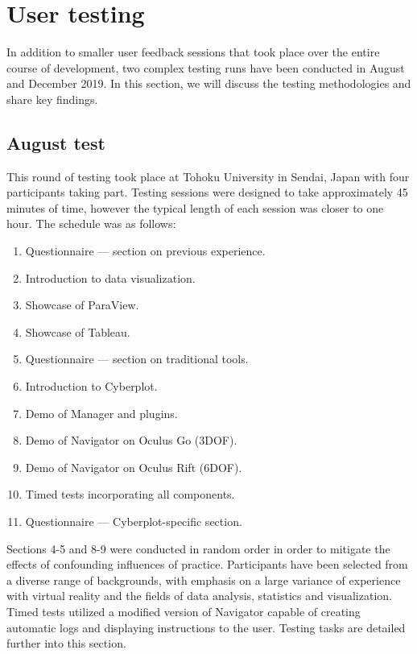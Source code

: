 \documentclass[thesis=M,english,hidelinks]{FITthesisXE}[2012/06/26]
\begin{document}
\section{User testing}

In addition to smaller user feedback sessions that took place over the entire course of development, two complex testing runs have been conducted in August and December 2019. In this section, we will discuss the testing methodologies and share key findings.

\subsection{August test}

This round of testing took place at Tohoku University in Sendai, Japan with four participants taking part. Testing sessions were designed to take approximately 45 minutes of time, however the typical length of each session was closer to one hour. The schedule was as follows:

\begin{enumerate}
\item Questionnaire --- section on previous experience.
\item Introduction to data visualization.
\item Showcase of ParaView.
\item Showcase of Tableau.
\item Questionnaire --- section on traditional tools.
\item Introduction to Cyberplot.
\item Demo of Manager and plugins.
\item Demo of Navigator on Oculus Go (3DOF).
\item Demo of Navigator on Oculus Rift (6DOF).
\item Timed tests incorporating all components.
\item Questionnaire --- Cyberplot-specific section.
\end{enumerate}

\newpage

Sections 4-5 and 8-9 were conducted in random order in order to mitigate the effects of confounding influences of practice. Participants have been selected from a diverse range of backgrounds, with emphasis on a large variance of experience with virtual reality and the fields of data analysis, statistics and visualization. Timed tests utilized a modified version of Navigator capable of creating automatic logs and displaying instructions to the user. Testing tasks are detailed further into this section.
\end{document}
